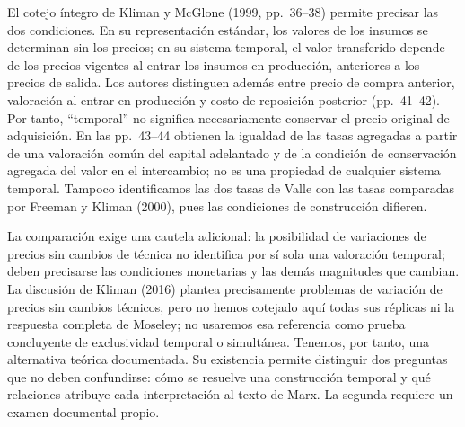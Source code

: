 \documentclass[10pt,twoside]{article}
\begin{document}
El cotejo íntegro de Kliman y McGlone (1999, pp.~36--38) permite precisar las dos condiciones. En su representación estándar, los valores de los insumos se determinan sin los precios; en su sistema temporal, el valor transferido depende de los precios vigentes al entrar los insumos en producción, anteriores a los precios de salida. Los autores distinguen además entre precio de compra anterior, valoración al entrar en producción y costo de reposición posterior (pp.~41--42). Por tanto, ``temporal'' no significa necesariamente conservar el precio original de adquisición. En las pp.~43--44 obtienen la igualdad de las tasas agregadas a partir de una valoración común del capital adelantado y de la condición de conservación agregada del valor en el intercambio; no es una propiedad de cualquier sistema temporal. Tampoco identificamos las dos tasas de Valle con las tasas comparadas por Freeman y Kliman (2000), pues las condiciones de construcción difieren.

La comparación exige una cautela adicional: la posibilidad de variaciones de precios sin cambios de técnica no identifica por sí sola una valoración temporal; deben precisarse las condiciones monetarias y las demás magnitudes que cambian. La discusión de Kliman (2016) plantea precisamente problemas de variación de precios sin cambios técnicos, pero no hemos cotejado aquí todas sus réplicas ni la respuesta completa de Moseley; no usaremos esa referencia como prueba concluyente de exclusividad temporal o simultánea. Tenemos, por tanto, una alternativa teórica documentada. Su existencia permite distinguir dos preguntas que no deben confundirse: cómo se resuelve una construcción temporal y qué relaciones atribuye cada interpretación al texto de Marx. La segunda requiere un examen documental propio.
\end{document}
